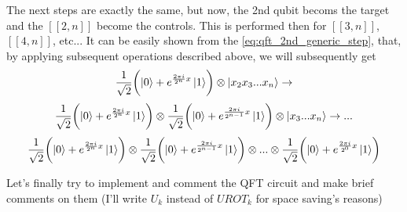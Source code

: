 \vspace{-0.2cm}
The next steps are exactly the same, but now, the 2nd qubit becoms the target and the $[\![2,n]\!]$ become the controls.
This is performed then for $[\![3,n]\!]$, $[\![4,n]\!]$, etc... It can be easily shown from the \autoref{eq:qft_2nd_generic_step}, that, by applying subsequent 
operations described above, we will subsequently get 
\vspace{-0.4cm}
\begin{gather}
\frac{1}{\sqrt{2}}\biggl( \ket{0}+e^{\frac{2\pi i}{2^n}x}\ket{1}\biggr)\otimes \ket{x_2x_3...x_n} \rightarrow
\label{eq:qft_first_n_steps}
\end{gather}
\vspace{-0.75cm}
\begin{gather}
\frac{1}{\sqrt{2}}\biggl( \ket{0}+e^{\frac{2\pi i}{2^n}x}\ket{1}\biggr)\otimes \frac{1}{\sqrt{2}}\biggl( \ket{0}+e^{\frac{2\pi i}{2^{n-1}}x}\ket{1}\biggr)\otimes \ket{x_3...x_n} \rightarrow ...
\label{eq:qft_second_n_steps}
\end{gather}
\vspace{-0.75cm}
\begin{gather}
\frac{1}{\sqrt{2}}\biggl( \ket{0}+e^{\frac{2\pi i}{2^n}x}\ket{1}\biggr)\otimes \frac{1}{\sqrt{2}}\biggl( \ket{0}+e^{\frac{2\pi i}{2^{n-1}}x}\ket{1}\biggr) \otimes ...\otimes \frac{1}{\sqrt{2}}\biggl( \ket{0}+e^{\frac{2\pi i}{2^0}x}\ket{1}\biggr)
\label{eq:qft_last_n_steps}
\end{gather}
\vspace{-0.4cm}

Let's finally try to implement and comment the QFT circuit and make brief comments on them (I'll write $U_k$ instead of $UROT_k$ for space saving's reasons)

